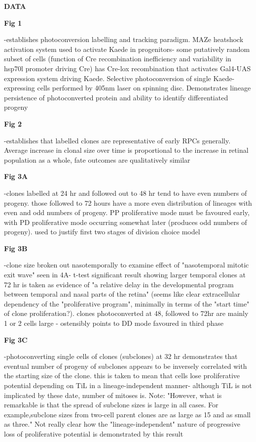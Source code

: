 \documentclass{ut-thesis}
\begin{document}
\bigskip

\textbf{DATA}

\bigskip

\textbf{Fig 1}

-establishes photoconversion labelling and tracking paradigm. MAZe heatshock activation system used to activate Kaede in progenitors- some putatively random subset of cells (function of Cre recombination inefficiency and variability in hsp70l promoter driving Cre) has Cre-lox recombination that activates Gal4-UAS expression system driving Kaede. Selective photoconversion of single Kaede-expressing cells performed by 405nm laser on spinning disc. Demonstrates lineage persistence of photoconverted protein and ability to identify differentiated progeny

\bigskip

\textbf{Fig 2}

-establishes that labelled clones are representative of early RPCs generally. Average increase in clonal size over time is proportional to the increase in retinal population as a whole, fate outcomes are qualitatively similar

\bigskip

\textbf{Fig 3A}

-clones labelled at 24 hr and followed out to 48 hr tend to have even numbers of progeny. those followed to 72 hours have a more even distribution of lineages with even and odd numbers of progeny. PP proliferative mode must be favoured early, with PD proliferative mode occurring somewhat later (produces odd numbers of progeny). used to justify first two stages of division choice model

\textbf{Fig 3B}

-clone size broken out nasotemporally to examine effect of "nasotemporal mitotic exit wave" seen in 4A- t-test significant result showing larger temporal clones at 72 hr is taken as evidence of "a relative delay in the developmental program between temporal and nasal parts of the retina" (seems like clear extracellular dependency of the "proliferative program", minimally in terms of the "start time" of clone proliferation?). clones photoconverted at 48, followed to 72hr are mainly 1 or 2 cells large - ostensibly points to DD mode favoured in third phase

\textbf{Fig 3C}

-photoconverting single cells of clones (subclones) at 32 hr demonstrates that eventual number of progeny of subclones appears to be inversely correlated with the starting size of the clone. this is taken to mean that cells lose proliferative potential depending on TiL in a lineage-independent manner- although TiL is not implicated by these date, number of mitoses is. Note: "However, what is remarkable is that the spread of subclone sizes is large in all cases. For example,subclone sizes from two-cell parent clones are as large as 15 and as small as three." Not really clear how the "lineage-independent" nature of progressive loss of proliferative potential is demonstrated by this result
\end{document}
